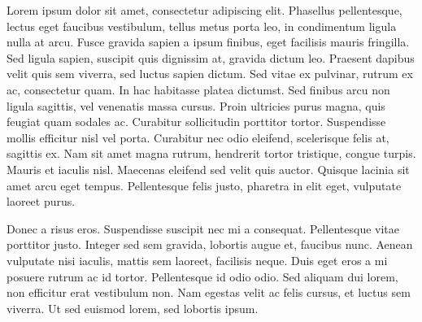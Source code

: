 \documentclass{article}
\begin{document}
Lorem ipsum dolor sit amet, consectetur adipiscing elit. Phasellus pellentesque, lectus eget
faucibus vestibulum, tellus metus porta leo, in condimentum ligula nulla at arcu. Fusce gravida
sapien a ipsum finibus, eget facilisis mauris fringilla. Sed ligula sapien, suscipit quis dignissim
at, gravida dictum leo. Praesent dapibus velit quis sem viverra, sed luctus sapien dictum. Sed vitae
ex pulvinar, rutrum ex ac, consectetur quam. In hac habitasse platea dictumst. Sed finibus arcu non
ligula sagittis, vel venenatis massa cursus. Proin ultricies purus magna, quis feugiat quam sodales
ac. Curabitur sollicitudin porttitor tortor. Suspendisse mollis efficitur nisl vel porta. Curabitur
nec odio eleifend, scelerisque felis at, sagittis ex. Nam sit amet magna rutrum, hendrerit tortor
tristique, congue turpis. Mauris et iaculis nisl. Maecenas eleifend sed velit quis auctor. Quisque
lacinia sit amet arcu eget tempus. Pellentesque felis justo, pharetra in elit eget, vulputate
laoreet purus.

Donec a risus eros. Suspendisse suscipit nec mi a consequat. Pellentesque vitae porttitor justo.
Integer sed sem gravida, lobortis augue et, faucibus nunc. Aenean vulputate nisi iaculis, mattis sem
laoreet, facilisis neque. Duis eget eros a mi posuere rutrum ac id tortor. Pellentesque id odio
odio. Sed aliquam dui lorem, non efficitur erat vestibulum non. Nam egestas velit ac felis cursus,
et luctus sem viverra. Ut sed euismod lorem, sed lobortis ipsum. 
\end{document}

